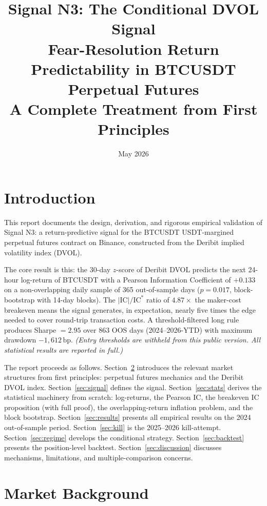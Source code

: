 \documentclass[12pt, a4paper]{article}
\title{\textbf{Signal N3: The Conditional DVOL Signal}\\[0.5em]
\large Fear-Resolution Return Predictability in BTCUSDT Perpetual Futures\\[0.3em]
\large A Complete Treatment from First Principles}
\author{}
\date{May 2026}
\theoremstyle{plain}
\theoremstyle{definition}
\newcommand{\IC}{\mathrm{IC}}
\newcommand{\bp}{\,\mathrm{bp}}
\begin{document}
\maketitle
\tableofcontents
\newpage

\section{Introduction}

This report documents the design, derivation, and rigorous empirical validation
of Signal N3: a return-predictive signal for the BTCUSDT USDT-margined
perpetual futures contract on Binance, constructed from the Deribit implied
volatility index (DVOL).

The core result is this: the 30-day $z$-score of Deribit DVOL
predicts the next 24-hour log-return of BTCUSDT with a Pearson
Information Coefficient of $+0.133$ on a non-overlapping daily sample
of 365 out-of-sample days ($p = 0.017$, block-bootstrap with 14-day blocks).
The $|\IC|/\IC^*$ ratio of $4.87\times$ the maker-cost breakeven means
the signal generates, in expectation, nearly five times the edge needed to cover
round-trip transaction costs. A threshold-filtered long rule produces Sharpe $= 2.95$ over 863 OOS days
(2024--2026-YTD) with maximum drawdown $-1{,}612\bp$.
\emph{(Entry thresholds are withheld from this public version.  All
statistical results are reported in full.)}

The report proceeds as follows. Section~\ref{sec:market} introduces the
relevant market structures from first principles: perpetual futures mechanics
and the Deribit DVOL index. Section~\ref{sec:signal} defines the signal.
Section~\ref{sec:stats} derives the statistical machinery from scratch:
log-returns, the Pearson IC, the breakeven IC proposition (with full proof),
the overlapping-return inflation problem, and the block bootstrap.
Section~\ref{sec:results} presents all empirical results on the 2024
out-of-sample period. Section~\ref{sec:kill} is the 2025--2026 kill-attempt.
Section~\ref{sec:regime} develops the conditional strategy. Section~\ref{sec:backtest}
presents the position-level backtest. Section~\ref{sec:discussion} discusses
mechanisms, limitations, and multiple-comparison concerns.


\section{Market Background}
\label{sec:market}
\end{document}
